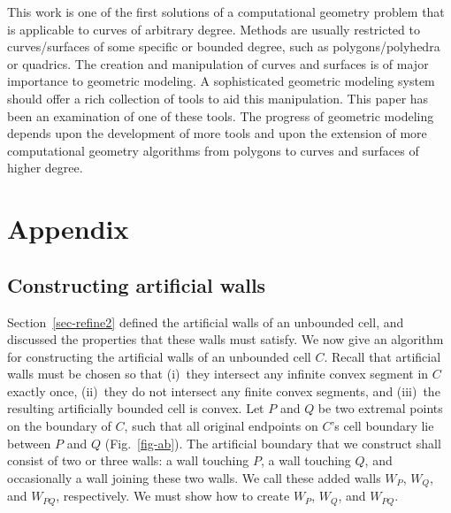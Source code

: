 This work is one of the first solutions
of a computational geometry problem that is applicable to curves of arbitrary degree.
Methods are usually restricted to curves/surfaces of some specific or 
bounded degree, such as polygons/polyhedra or quadrics.
The creation and manipulation of curves and surfaces is of major importance 
to geometric modeling.
A sophisticated geometric modeling system should offer 
a rich collection of tools to aid this manipulation.
This paper has been an examination of one of these tools.
The progress of geometric modeling depends upon the development of more tools and upon 
the extension of more computational geometry algorithms from polygons to curves and 
surfaces of higher degree.

\section{Appendix}
\label{sec-append}
\subsection{Constructing artificial walls}
\label{sec-caa}
Section~\ref{sec-refine2} defined the artificial walls of an unbounded cell,
and discussed the properties that these walls must satisfy.
We now give an algorithm for constructing the artificial walls of an unbounded
cell $C$.
Recall that artificial walls must be chosen so that 
(i)~they intersect any infinite convex segment in $C$ exactly once,
(ii)~they do not intersect any finite convex segments, and
(iii)~the resulting artificially bounded cell is convex.
Let $P$ and $Q$ be two extremal points on the boundary of $C$, 
such that all original endpoints
on $C$'s cell boundary lie between $P$ and $Q$ (Fig.~\ref{fig-ab}).
The artificial boundary that we construct shall consist of two or three walls:
a wall touching $P$, a wall touching $Q$, and occasionally a wall joining these two walls.
We call these added walls $W_{P}$, $W_{Q}$, and $W_{PQ}$, respectively.
We must show how to create $W_{P}$, $W_{Q}$, and $W_{PQ}$.

